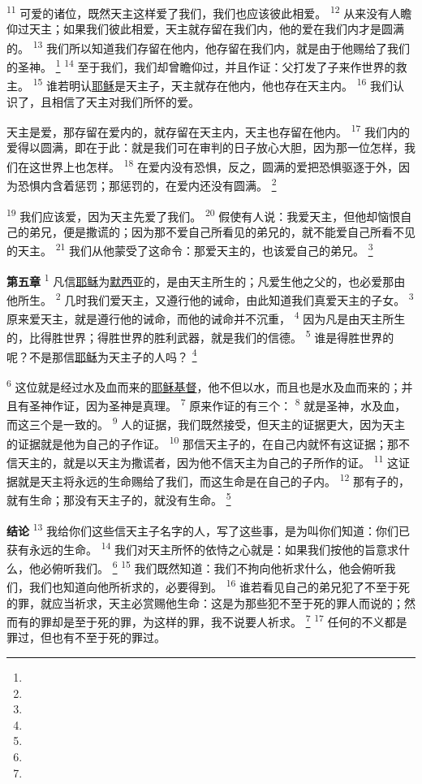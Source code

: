 \begin{multicols}{2}
\textsuperscript{11}
可爱的诸位，既然天主这样爱了我们，我们也应该彼此相爱。
\textsuperscript{12}
从来没有人瞻仰过天主；如果我们彼此相爱，天主就存留在我们内，他的爱在我们内才是圆满的。
\textsuperscript{13}
我们所以知道我们存留在他内，他存留在我们内，就是由于他赐给了我们的圣神。
\footnote{}
\textsuperscript{14}
至于我们，我们却曾瞻仰过，并且作证：父打发了子来作世界的救主。
\textsuperscript{15}
谁若明认\uline{耶稣}是天主子，天主就存在他内，他也存在天主内。
\textsuperscript{16}
我们认识了，且相信了天主对我们所怀的爱。

天主是爱，那存留在爱内的，就存留在天主内，天主也存留在他内。
\textsuperscript{17}
我们内的爱得以圆满，即在于此：就是我们可在审判的日子放心大胆，因为那一位怎样，我们在这世界上也怎样。
\textsuperscript{18}
在爱内没有恐惧，反之，圆满的爱把恐惧驱逐于外，因为恐惧内含着惩罚；那惩罚的，在爱内还没有圆满。
\footnote{}

\textsuperscript{19}
我们应该爱，因为天主先爱了我们。
\textsuperscript{20}
假使有人说：我爱天主，但他却恼恨自己的弟兄，便是撒谎的；因为那不爱自己所看见的弟兄的，就不能爱自己所看不见的天主。
\textsuperscript{21}
我们从他蒙受了这命令：那爱天主的，也该爱自己的弟兄。
\footnote{}

\textbf{第五章\quad}
\textsuperscript{1}
凡信\uline{耶稣}为\uline{默西亚}的，是由天主所生的；凡爱生他之父的，也必爱那由他所生。
\textsuperscript{2}
几时我们爱天主，又遵行他的诫命，由此知道我们真爱天主的子女。
\textsuperscript{3}
原来爱天主，就是遵行他的诫命，而他的诫命并不沉重，
\textsuperscript{4}
因为凡是由天主所生的，比得胜世界；得胜世界的胜利武器，就是我们的信德。
\textsuperscript{5}
谁是得胜世界的呢？不是那信\uline{耶稣}为天主子的人吗？
\footnote{}

\textsuperscript{6}
这位就是经过水及血而来的\uline{耶稣}\uline{基督}，他不但以水，而且也是水及血而来的；并且有圣神作证，因为圣神是真理。
\textsuperscript{7}
原来作证的有三个：
\textsuperscript{8}
就是圣神，水及血，而这三个是一致的。
\textsuperscript{9}
人的证据，我们既然接受，但天主的证据更大，因为天主的证据就是他为自己的子作证。
\textsuperscript{10}
那信天主子的，在自己内就怀有这证据；那不信天主的，就是以天主为撒谎者，因为他不信天主为自己的子所作的证。
\textsuperscript{11}
这证据就是天主将永远的生命赐给了我们，而这生命是在自己的子内。
\textsuperscript{12}
那有子的，就有生命；那没有天主子的，就没有生命。
\footnote{}

\textbf{结论\quad}
\textsuperscript{13}
我给你们这些信天主子名字的人，写了这些事，是为叫你们知道：你们已获有永远的生命。
\textsuperscript{14}
我们对天主所怀的依恃之心就是：如果我们按他的旨意求什么，他必俯听我们。
\footnote{}
\textsuperscript{15}
我们既然知道：我们不拘向他祈求什么，他会俯听我们，我们也知道向他所祈求的，必要得到。
\textsuperscript{16}
谁若看见自己的弟兄犯了不至于死的罪，就应当祈求，天主必赏赐他生命：这是为那些犯不至于死的罪人而说的；然而有的罪却是至于死的罪，为这样的罪，我不说要人祈求。
\footnote{}
\textsuperscript{17}
任何的不义都是罪过，但也有不至于死的罪过。


\end{multicols}
